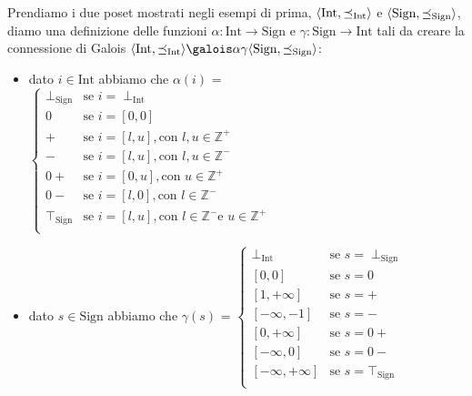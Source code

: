 \begin{example}
Prendiamo i due poset mostrati negli esempi di prima, \(\langle \textrm{Int}, \preceq_{\textrm{Int}}\rangle\) e \(\langle \textrm{Sign}, \preceq_{\textrm{Sign}}\rangle\), diamo una definizione delle funzioni \(\alpha:\textrm{Int}\rightarrow\textrm{Sign}\) e \(\gamma:\textrm{Sign}\rightarrow\textrm{Int}\) tali da creare la connessione di Galois \(\GaloisConnection{\textrm{Int}}{\textrm{Sign}}\):
\begin{itemize}
\item dato \(i\in\textrm{Int}\) abbiamo che \(\alpha(i)\) = 
$
\begin{cases}
\perp_{\textrm{Sign}}  & \textrm{se } i=\perp_{\textrm{Int}}\\
0  & \textrm{se } i=[0, 0]\\
+  & \textrm{se } i=[l, u], \textrm{con } l, u \in\mathbb{Z}^+\\
-  & \textrm{se } i=[l, u], \textrm{con } l, u \in\mathbb{Z}^-\\
0+  & \textrm{se } i=[0, u], \textrm{con } u \in\mathbb{Z}^+\\
0-  & \textrm{se } i=[l, 0], \textrm{con } l \in\mathbb{Z}^-\\
\top_{\textrm{Sign}}  & \textrm{se } i=[l, u], \textrm{con } l\in\mathbb{Z}^- \textrm{e } u \in\mathbb{Z}^+\\
\end{cases}
$
\item dato \(s\in\textrm{Sign}\) abbiamo che \(\gamma(s)\) =
$
\begin{cases}
\perp_{\textrm{Int}}  & \textrm{se } s=\perp_{\textrm{Sign}}\\
[0, 0] & \textrm{se } s=0 \\
[1, +\infty] & \textrm{se } s=+\\
[-\infty, -1] & \textrm{se } s=-\\
[0, +\infty] & \textrm{se } s=0+\\
[-\infty, 0] & \textrm{se } s=0-\\
[-\infty, +\infty] & \textrm{se } s=\top_{\textrm{Sign}}\\
\end{cases}
$

\end{itemize}
\end{example}

